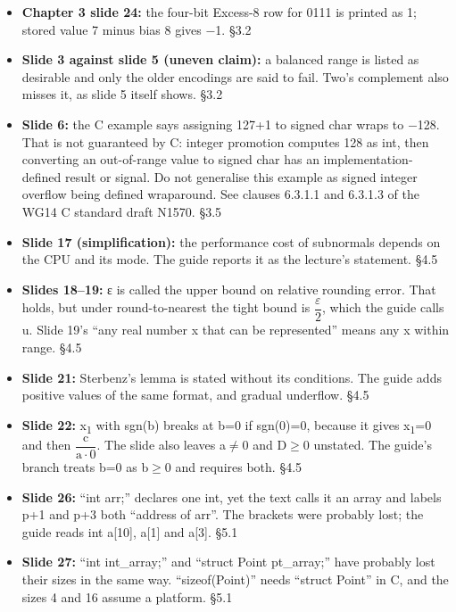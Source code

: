 \documentclass[11pt]{article}
\begin{document}
\begin{keepsection}
\begin{itemize}
\item \textbf{Chapter 3 slide 24:} the four-bit Excess-8 row for 0111 is printed as 1; stored value 7 minus bias 8 gives \ensuremath{-}1. \hfill{\small\color{FAUblue}§3.2}
\item \textbf{Slide 3 against slide 5 (uneven claim):} a balanced range is listed as desirable and only the older encodings are said to fail. Two’s complement also misses it, as slide 5 itself shows. \hfill{\small\color{FAUblue}§3.2}
\item \textbf{Slide 6:} the C example says assigning 127+1 to signed char wraps to \ensuremath{-}128. That is not guaranteed by C: integer promotion computes 128 as int, then converting an out-of-range value to signed char has an implementation-defined result or signal. Do not generalise this example as signed integer overflow being defined wraparound. See clauses 6.3.1.1 and 6.3.1.3 of the WG14 C standard draft N1570. \hfill{\small\color{FAUblue}§3.5}
\item \textbf{Slide 17 (simplification):} the performance cost of subnormals depends on the CPU and its mode. The guide reports it as the lecture’s statement. \hfill{\small\color{FAUblue}§4.5}
\item \textbf{Slides 18–19:} ε is called the upper bound on relative rounding error. That holds, but under round-to-nearest the tight bound is {\small\ensuremath{\dfrac{ε}{2}}}, which the guide calls u. Slide 19’s “any real number x that can be represented” means any x within range. \hfill{\small\color{FAUblue}§4.5}
\item \textbf{Slide 21:} Sterbenz’s lemma is stated without its conditions. The guide adds positive values of the same format, and gradual underflow. \hfill{\small\color{FAUblue}§4.5}
\item \textbf{Slide 22:} x\textsubscript{1} with sgn(b) breaks at b=0 if sgn(0)=0, because it gives x\textsubscript{1}=0 and then {\small\ensuremath{\dfrac{\mathrm{c}}{\mathrm{a}\cdot 0}}}. The slide also leaves a\ensuremath{\neq}0 and D\ensuremath{\geq}0 unstated. The guide’s branch treats b=0 as b\ensuremath{\geq}0 and requires both. \hfill{\small\color{FAUblue}§4.5}
\item \textbf{Slide 26:} “int arr;” declares one int, yet the text calls it an array and labels p+1 and p+3 both “address of arr”. The brackets were probably lost; the guide reads int a[10], a[1] and a[3]. \hfill{\small\color{FAUblue}§5.1}
\item \textbf{Slide 27:} “int int\_array;” and “struct Point pt\_array;” have probably lost their sizes in the same way. “sizeof(Point)” needs “struct Point” in C, and the sizes 4 and 16 assume a platform. \hfill{\small\color{FAUblue}§5.1}

\end{itemize}
\end{keepsection}
\end{document}
